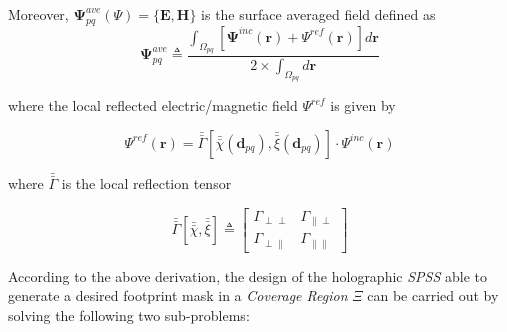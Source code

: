 Moreover, $\mathbf{\Psi}_{pq}^{ave}(\Psi)=\{\mathbf{E},\mathbf{H}\}$
is the surface averaged field defined as\begin{equation}
\mathbf{\Psi}_{pq}^{ave}\triangleq\frac{\int_{\Omega_{pq}}[\mathbf{\Psi}^{inc}(\mathbf{r})+\Psi^{ref}(\mathbf{r})]d\mathbf{r}}{2\times\int_{\Omega_{pq}}d\mathbf{r}}\label{eq:12}\end{equation}


where the local reflected electric/magnetic field $\Psi^{ref}$ is
given by

\begin{equation}
\Psi^{ref}(\mathbf{r})=\bar{\bar{\Gamma}}[\bar{\bar{\chi}}(\mathbf{d}_{pq}),\bar{\bar{\xi}}(\mathbf{d}_{pq})]\cdot\Psi^{inc}(\mathbf{r})\label{eq:13}\end{equation}


where $\bar{\bar{\Gamma}}$ is the local reflection tensor

\begin{equation}
\bar{\bar{\Gamma}}[\bar{\bar{\chi}},\bar{\bar{\xi}}]\triangleq\left[\begin{array}{cc}
\Gamma_{\perp\perp} & \Gamma_{\parallel\perp}\\
\Gamma_{\perp\parallel} & \Gamma_{\parallel\parallel}\end{array}\right]\label{eq:14}\end{equation}


According to the above derivation, the design of the holographic \emph{SPSS}
able to generate a desired footprint mask in a \emph{Coverage Region}
$\Xi$ can be carried out by solving the following two sub-problems:

